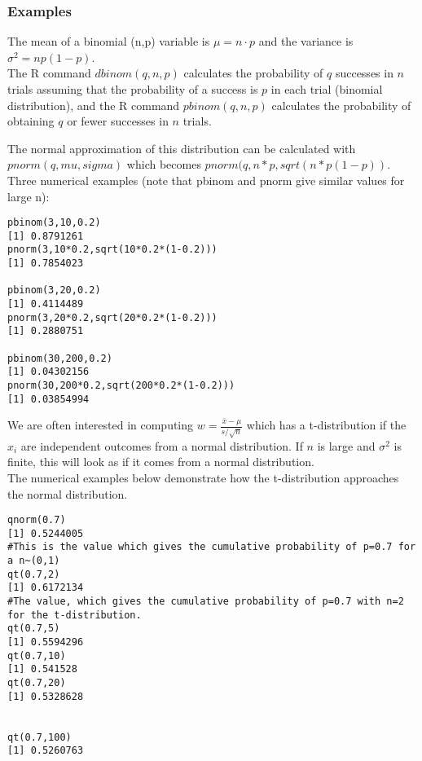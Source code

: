 \documentclass[12pt,a4paper]{article}
\theoremstyle{regla}
\theoremstyle{remark}
\theoremstyle{definition}
\theoremstyle{nonumberbreak}
\begin{document}
\subsubsection{Examples}
\begin{xmpl}

The mean of a binomial (n,p) variable is $\mu=n\cdot p$ and the variance is $\sigma^2=np(1-p)$.\\

The R command $dbinom(q,n,p)$ calculates the probability of $q$ successes in $n$ trials assuming that the probability of a success is $p$ in each trial (binomial distribution), and the R command $pbinom(q,n,p)$ calculates the probability of obtaining $q$ or fewer successes in $n$ trials.

The normal approximation of this distribution can be calculated with $pnorm(q,mu,sigma)$ which becomes $pnorm(q,n*p,sqrt(n*p(1-p))$. Three numerical examples (note that pbinom and pnorm give similar values for large n):
\begin{lstlisting}
pbinom(3,10,0.2)
[1] 0.8791261
pnorm(3,10*0.2,sqrt(10*0.2*(1-0.2)))
[1] 0.7854023

pbinom(3,20,0.2)
[1] 0.4114489
pnorm(3,20*0.2,sqrt(20*0.2*(1-0.2)))
[1] 0.2880751

pbinom(30,200,0.2)
[1] 0.04302156
pnorm(30,200*0.2,sqrt(200*0.2*(1-0.2)))
[1] 0.03854994
\end{lstlisting}
\end{xmpl}
\begin{xmpl}


We are often interested in computing $w=\frac{\bar{x}-\mu}{s/\sqrt{n}}$ which has a t-distribution if the $x_i$ are independent outcomes from a normal distribution. If $n$ is large and $\sigma^2$ is finite, this will look as if it comes from a normal distribution.\\

The numerical examples below demonstrate how the t-distribution approaches the normal distribution.

\begin{lstlisting}
qnorm(0.7)
[1] 0.5244005 
#This is the value which gives the cumulative probability of p=0.7 for a n~(0,1)
qt(0.7,2)
[1] 0.6172134
#The value, which gives the cumulative probability of p=0.7 with n=2 for the t-distribution.
qt(0.7,5)
[1] 0.5594296
qt(0.7,10)
[1] 0.541528
qt(0.7,20)
[1] 0.5328628


qt(0.7,100)
[1] 0.5260763
\end{lstlisting}
\end{xmpl}
\end{document}
